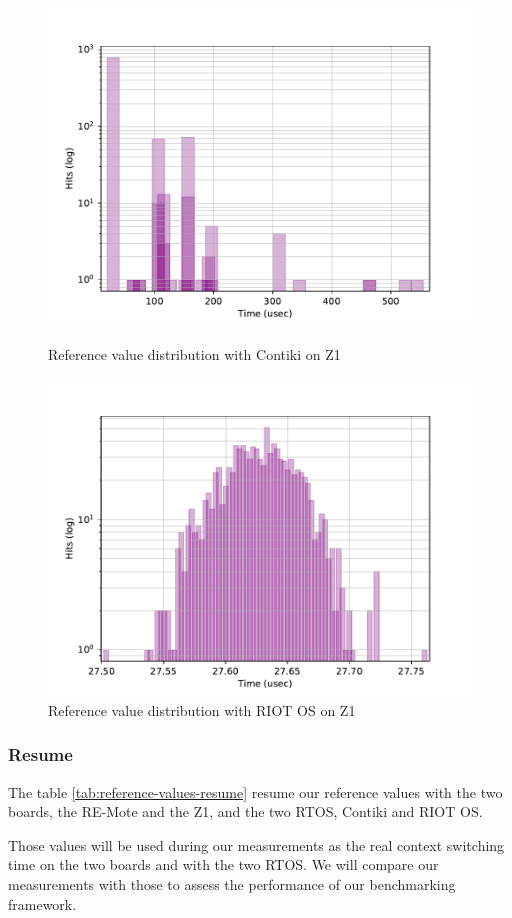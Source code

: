 \begin{figure}[!ht]
    \begin{minipage}{.45\textwidth}
        \centering
        \includegraphics[scale=.4]{assets/reference-value-contiki-z1.pdf}
        \caption{Reference value distribution with Contiki on Z1\label{fig:reference-value-contiki-z1}}
    \end{minipage}\hfill
    \begin{minipage}{.45\textwidth}        
        \centering
        \includegraphics[scale=.4]{assets/reference-value-riot-z1.pdf}
        \caption{Reference value distribution with RIOT OS on Z1\label{fig:reference-value-riot-z1}}
    \end{minipage}
\end{figure}

\subsubsection{Resume}
The table \ref{tab:reference-values-resume} resume our reference values with the two boards, the RE-Mote and the Z1, and the two RTOS, Contiki and RIOT OS.



Those values will be used during our measurements as the real context switching time on the two boards and with the two RTOS.
We will compare our measurements with those to assess the performance of our benchmarking framework.